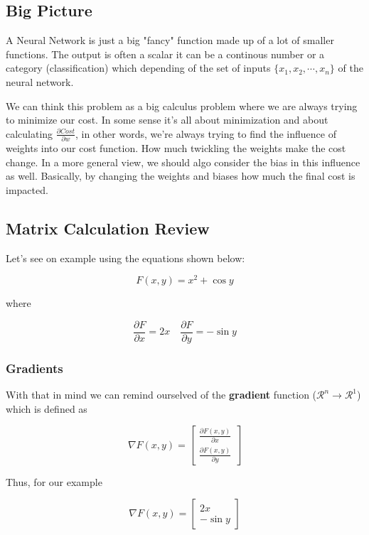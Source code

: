 \documentclass[a4paper,10pt]{article}
\begin{document}
\subsection{Big Picture}

A Neural Network is just a big "fancy" function made up of a lot of smaller functions. The output is often a scalar it can be a continous number or a category (classification) which depending of the set of inputs $\{ x_1, x_2, \cdots, x_n \}$ of the neural network.

We can think this problem as a big calculus problem where we are always trying to minimize our cost. In some sense it's all about minimization and about calculating $\frac{\partial Cost}{\partial w}$, in other words, we're always trying to find the influence of weights into our cost function. How much twickling the weights make the cost change. In a more general view, we should algo consider the bias in this influence as well. Basically, by changing the weights and biases how much the final cost is impacted. 

\subsection{Matrix Calculation Review}

Let's see on example using the equations shown below:

$$ F(x, y) = x^2 + \cos y $$

\noindent where 

$$ \frac{\partial F}{\partial x} = 2x \quad \frac{\partial F}{\partial y} = -\sin y $$

\subsubsection{Gradients}

With that in mind we can remind ourselved of the \textbf{gradient} function ($\mathcal{R}^n \rightarrow \mathcal{R}^1$) which is defined as

$$
\nabla F(x, y) = \begin{bmatrix}
    \frac{\partial F(x, y)}{\partial x} \\
    \frac{\partial F(x, y)}{\partial y}
\end{bmatrix}
$$

Thus, for our example

$$
\nabla F(x, y) = \begin{bmatrix}
    2x \\
    - \sin y
\end{bmatrix}
$$
\end{document}
